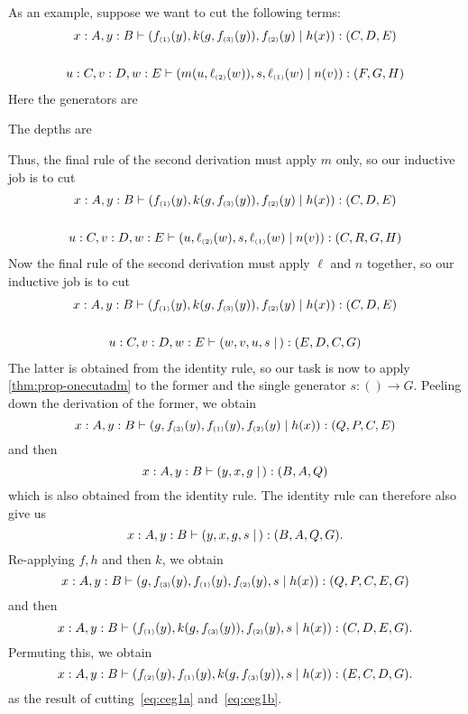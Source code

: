 \begin{props}
As an example, suppose we want to cut the following terms:
\begin{gather}
  x:A,y:B \types (f\s1(y),k(g,f\s3(y)),f\s2(y) \mid h(x)) : (C,D,E)\label{eq:ceg5a}
  \\\notag\\
  u:C,v:D,w:E \types (m(u,\ell\s2(w)),s,\ell\s1(w) \mid n(v)) : (F,G,H)\label{eq:ceg5b}
\end{gather}
Here the generators are
The depths are
Thus, the final rule of the second derivation must apply $m$ only, so our inductive job is to cut 
\begin{gather}
  x:A,y:B \types (f\s1(y),k(g,f\s3(y)),f\s2(y) \mid h(x)) : (C,D,E)\label{eq:ceg2a}
  \\\notag\\
  u:C,v:D,w:E \types (u,\ell\s2(w),s,\ell\s1(w) \mid n(v)) : (C,R,G,H)\label{eq:ceg2b}
\end{gather}
Now the final rule of the second derivation must apply $\ell$ and $n$ together, so our inductive job is to cut
\begin{gather}
  x:A,y:B \types (f\s1(y),k(g,f\s3(y)),f\s2(y) \mid h(x)) : (C,D,E)\label{eq:ceg1a}
  \\\notag\\
  u:C,v:D,w:E \types (w,v,u,s \mid\,) : (E,D,C,G)\label{eq:ceg1b}
\end{gather}
The latter is obtained from the identity rule, so our task is now to apply \cref{thm:prop-onecutadm} to the former and the single generator $s:()\to G$.
Peeling down the derivation of the former, we obtain
\[ x:A,y:B \vdash (g,f_{\scriptscriptstyle(3)}(y),f_{\scriptscriptstyle(1)}(y),f_{\scriptscriptstyle(2)}(y) \mid h(x)) : (Q,P,C,E) \]
and then
\[ x:A,y:B \vdash (y,x,g \mid\,) : (B,A,Q) \]
which is also obtained from the identity rule.
The identity rule can therefore also give us
\[ x:A,y:B \vdash (y,x,g,s \mid\,) : (B,A,Q,G). \]
Re-applying $f,h$ and then $k$, we obtain
\[ x:A,y:B \vdash (g,f_{\scriptscriptstyle(3)}(y),f_{\scriptscriptstyle(1)}(y),f_{\scriptscriptstyle(2)}(y),s \mid h(x)) : (Q,P,C,E,G) \]
and then
\[ x:A,y:B \vdash (f_{\scriptscriptstyle(1)}(y),k(g,f_{\scriptscriptstyle(3)}(y)),f_{\scriptscriptstyle(2)}(y),s \mid h(x)) : (C,D,E,G). \]
Permuting this, we obtain
\[ x:A,y:B \vdash (f_{\scriptscriptstyle(2)}(y),f_{\scriptscriptstyle(1)}(y),k(g,f_{\scriptscriptstyle(3)}(y)),s \mid h(x)) : (E,C,D,G). \]
as the result of cutting~\eqref{eq:ceg1a} and~\eqref{eq:ceg1b}.


\end{props}
